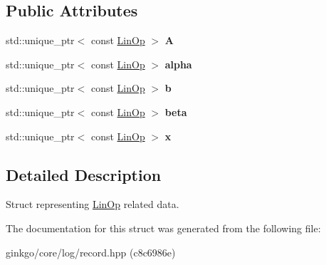 \subsection*{Public Attributes}
\begin{DoxyCompactItemize}
\item 
\mbox{\label{structgko_1_1log_1_1linop__data_a02a1a3dacdf707cc5b6ee1173aad7aad}} 
std\+::unique\+\_\+ptr$<$ const \hyperlink{classgko_1_1LinOp}{Lin\+Op} $>$ {\bfseries A}
\item 
\mbox{\label{structgko_1_1log_1_1linop__data_ac65bf9ffa7f7d14a86b21d073d21471e}} 
std\+::unique\+\_\+ptr$<$ const \hyperlink{classgko_1_1LinOp}{Lin\+Op} $>$ {\bfseries alpha}
\item 
\mbox{\label{structgko_1_1log_1_1linop__data_aa03f552586f8de9e953057762d6e0b4b}} 
std\+::unique\+\_\+ptr$<$ const \hyperlink{classgko_1_1LinOp}{Lin\+Op} $>$ {\bfseries b}
\item 
\mbox{\label{structgko_1_1log_1_1linop__data_a5c0014fd2c39f067bbcc32e79b458b7b}} 
std\+::unique\+\_\+ptr$<$ const \hyperlink{classgko_1_1LinOp}{Lin\+Op} $>$ {\bfseries beta}
\item 
\mbox{\label{structgko_1_1log_1_1linop__data_a9c7297540351403305fc1633dad9fea6}} 
std\+::unique\+\_\+ptr$<$ const \hyperlink{classgko_1_1LinOp}{Lin\+Op} $>$ {\bfseries x}
\end{DoxyCompactItemize}


\subsection{Detailed Description}
Struct representing \hyperlink{classgko_1_1LinOp}{Lin\+Op} related data. 

The documentation for this struct was generated from the following file\+:\begin{DoxyCompactItemize}
\item 
ginkgo/core/log/record.\+hpp (c8c6986e)\end{DoxyCompactItemize}
